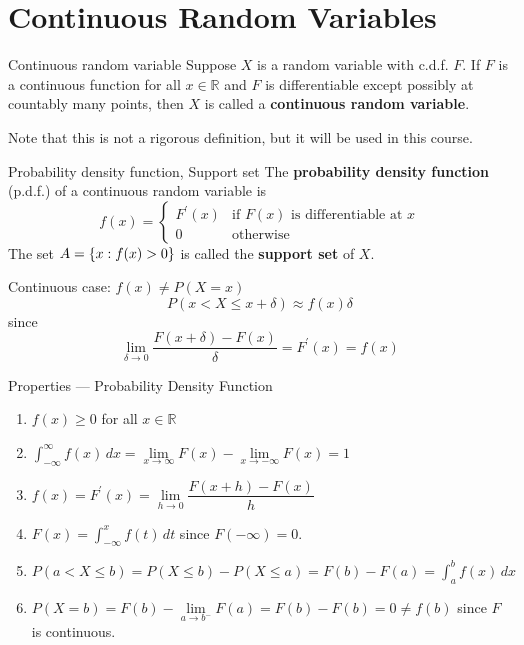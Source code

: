 \section{Continuous Random Variables}
\begin{Definition}{Continuous random variable}{}
    Suppose $ X $ is a random variable with c.d.f. $ F $. If $ F $
    is a continuous function for all $ x\in\mathbb{R} $ and
    $ F $ is differentiable except possibly at
    countably many points, then $ X $ is called a
    \textbf{continuous random variable}.
\end{Definition}
Note that this is not a rigorous definition, but it will be
used in this course.

\begin{Definition}{Probability density function, Support set}{}
    The \textbf{probability density function} (p.d.f.) of a continuous random variable
    is
    \[ f(x)=\begin{cases}
            F^\prime(x) & \text{if }F(x)\text{ is differentiable at }x \\
            0           & \text{otherwise}
        \end{cases} \]
    The set $ A=\{x:f(x)>0\} $ is called the \textbf{support set}
    of $ X $.
\end{Definition}

Continuous case: $ f(x)\neq P(X=x) $
\[ P(x<X\leqslant x+\delta)\approx f(x)\delta \]
since
\[ \lim\limits_{{\delta} \to {0}}\frac{F(x+\delta)-F(x)}{\delta}=F^\prime(x)=f(x) \]
\begin{Definition}{Properties --- Probability Density Function}{}
    \begin{enumerate}[label=(\Roman*)]
        \item $ f(x)\geqslant 0 $ for all $ x\in\mathbb{R} $
        \item $ \displaystyle \int_{-\infty}^{\infty} f(x)\, d{x} =
                  \lim\limits_{{x} \to {\infty}} F(x)-
                  \lim\limits_{{x} \to {-\infty}} F(x)= 1 $
        \item $ f(x)=F^\prime(x)=
                  \lim\limits_{{h} \to {0}} \dfrac{F(x+h)-F(x)}{h} $
        \item $ F(x)=\displaystyle \int_{-\infty}^{x} f(t)\, d{t} $
              since $ F(-\infty)=0 $.
        \item $ P(a< X\leqslant b)=P(X\leqslant b)-
                  P(X\leqslant a)=F(b)-F(a)
                  =\displaystyle \int_{a}^{b} f(x)\, d{x}  $
        \item $ P(X=b)=F(b)-\lim\limits_{{a} \to {b^-}}
                  F(a)=F(b)-F(b) =0\neq f(b) $ since $ F $ is continuous.
    \end{enumerate}
\end{Definition}

